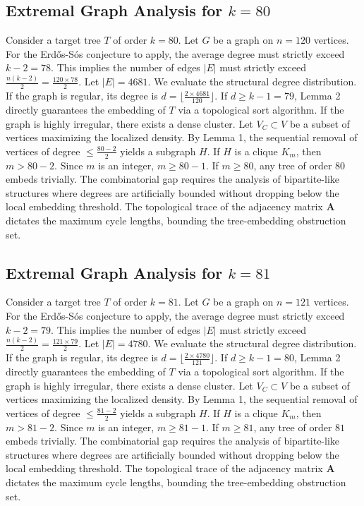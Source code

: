 \documentclass[11pt,a4paper]{article}
\begin{document}
\subsection{Extremal Graph Analysis for $k=80$}
Consider a target tree $T$ of order $k=80$.
Let $G$ be a graph on $n=120$ vertices.
For the Erd\H{o}s-S\'os conjecture to apply, the average degree must strictly exceed $k-2 = 78$.
This implies the number of edges $|E|$ must strictly exceed $\frac{n(k-2)}{2} = \frac{120 \times 78}{2}$.
Let $|E| = 4681$.
We evaluate the structural degree distribution. If the graph is regular, its degree is $d = \lfloor \frac{2 \times 4681}{120} \rfloor$.
If $d \geq k-1 = 79$, Lemma 2 directly guarantees the embedding of $T$ via a topological sort algorithm.
If the graph is highly irregular, there exists a dense cluster. Let $V_C \subset V$ be a subset of vertices maximizing the localized density.
By Lemma 1, the sequential removal of vertices of degree $\leq \frac{80-2}{2}$ yields a subgraph $H$.
If $H$ is a clique $K_{m}$, then $m > 80-2$. Since $m$ is an integer, $m \geq 80-1$. If $m \geq 80$, any tree of order $80$ embeds trivially.
The combinatorial gap requires the analysis of bipartite-like structures where degrees are artificially bounded without dropping below the local embedding threshold. The topological trace of the adjacency matrix $\mathbf{A}$ dictates the maximum cycle lengths, bounding the tree-embedding obstruction set.


\subsection{Extremal Graph Analysis for $k=81$}
Consider a target tree $T$ of order $k=81$.
Let $G$ be a graph on $n=121$ vertices.
For the Erd\H{o}s-S\'os conjecture to apply, the average degree must strictly exceed $k-2 = 79$.
This implies the number of edges $|E|$ must strictly exceed $\frac{n(k-2)}{2} = \frac{121 \times 79}{2}$.
Let $|E| = 4780$.
We evaluate the structural degree distribution. If the graph is regular, its degree is $d = \lfloor \frac{2 \times 4780}{121} \rfloor$.
If $d \geq k-1 = 80$, Lemma 2 directly guarantees the embedding of $T$ via a topological sort algorithm.
If the graph is highly irregular, there exists a dense cluster. Let $V_C \subset V$ be a subset of vertices maximizing the localized density.
By Lemma 1, the sequential removal of vertices of degree $\leq \frac{81-2}{2}$ yields a subgraph $H$.
If $H$ is a clique $K_{m}$, then $m > 81-2$. Since $m$ is an integer, $m \geq 81-1$. If $m \geq 81$, any tree of order $81$ embeds trivially.
The combinatorial gap requires the analysis of bipartite-like structures where degrees are artificially bounded without dropping below the local embedding threshold. The topological trace of the adjacency matrix $\mathbf{A}$ dictates the maximum cycle lengths, bounding the tree-embedding obstruction set.
\end{document}
